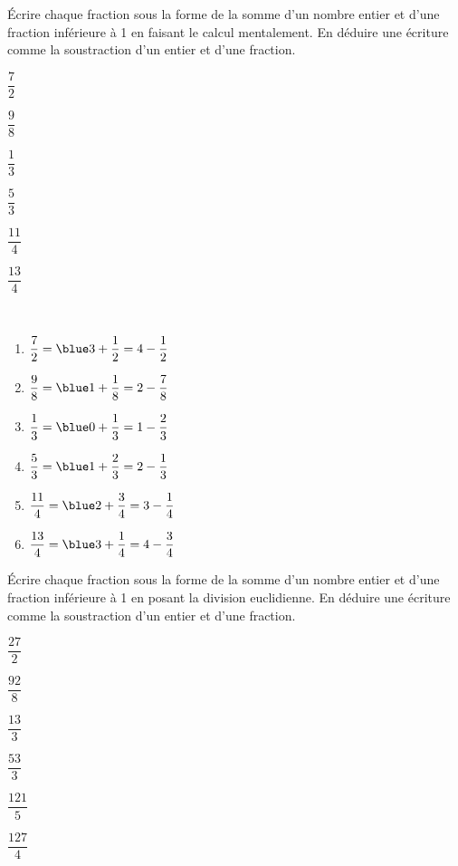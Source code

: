 \begin{colonne*exercice}

\begin{exercice} %
   Écrire chaque fraction sous la forme de la somme d'un nombre entier et d'une fraction inférieure à 1 en faisant le calcul mentalement. En déduire une écriture comme la soustraction d'un entier et d'une fraction. \medskip
   \begin{colenumerate}{3}
      \item $\dfrac72$ \medskip
      \item $\dfrac98$
      \item $\dfrac13$
      \item $\dfrac53$
      \item $\dfrac{11}{4}$
      \item $\dfrac{13}{4}$
   \end{colenumerate}
\end{exercice}

\begin{corrige}
   \ \\ [-5mm]
   \begin{enumerate}
      \item $\dfrac72 =\blue 3+\dfrac12 =4-\dfrac12$ \medskip
      \item $\dfrac98 =\blue 1+\dfrac18 =2-\dfrac78$ \medskip
      \item $\dfrac13 =\blue 0+\dfrac13 =1-\dfrac23$ \medskip
      \item $\dfrac53 =\blue 1+\dfrac23 =2-\dfrac13$ \medskip
      \item $\dfrac{11}{4} =\blue 2+\dfrac34 =3-\dfrac14$ \medskip
      \item $\dfrac{13}{4} =\blue 3+\dfrac14 =4-\dfrac34$
   \end{enumerate}
\end{corrige}

\bigskip


\begin{exercice} %
   Écrire chaque fraction sous la forme de la somme d'un nombre entier et d'une fraction inférieure à 1 en posant la division euclidienne. En déduire une écriture comme la soustraction d'un entier et d'une fraction. \medskip
   \begin{colenumerate}{3}
      \item $\dfrac{27}2$ \medskip
      \item $\dfrac{92}8$
      \item $\dfrac{13}{3}$
      \item $\dfrac{53}{3}$
      \item $\dfrac{121}{5}$
      \item $\dfrac{127}{4}$
   \end{colenumerate}
\end{exercice}


\end{colonne*exercice}
